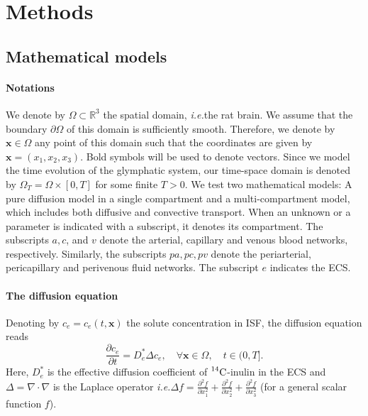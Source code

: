 \documentclass[a4paper,11pt]{article}
\newcommand{\ie}{\emph{i.e.}\;}
\newcommand{\1}{^{(1)}}
\newcommand{\2}{^{(2)}}
\newcommand{\R}{\mathbb{R}}
\newcommand {\f}   {\frac}
\newcommand {\p}   {\partial}
\newcommand {\x}   {\mathbf{x}}
\newcommand{\Cinulin}{$\prescript{14}{}{\text{C}}$-inulin }
\begin{document}
\section{Methods}
\label{sec:method}
\subsection{Mathematical models}
\paragraph{Notations} We denote by $\Omega \subset \R^3$ the spatial domain, \ie the rat brain. We assume that the boundary $\p \Omega$  of this domain is sufficiently smooth. Therefore, we denote by $\x \in \Omega$ any point of this domain such that the coordinates are given by $\x =(x_1,x_2,x_3)$. Bold symbols will be used to denote vectors. Since we model the time evolution of the glymphatic system, our time-space domain is denoted by $\Omega_T = \Omega \times [0,T]$ for some finite $T> 0$. We test two mathematical models: A pure diffusion model in a single compartment and a multi-compartment model, which includes both diffusive and convective transport. When an unknown or a parameter is indicated with a subscript, it denotes its compartment. The subscripts $a,c$, and $v$ denote the arterial, capillary and venous blood networks, respectively. Similarly, the subscripts $pa, pc, pv$ denote the periarterial, pericapillary and perivenous fluid networks. The subscript $e$ indicates the ECS.

\paragraph{The diffusion equation}
Denoting by $c_e = c_e(t,\x)$ the solute concentration in ISF, the diffusion equation reads
\begin{equation}
    \f{\p c_e}{\p t} = D_e^* \Delta c_e , \quad \forall \x\in \Omega,\quad t\in (0,T].
    \label{eq:diffusion-convection}
\end{equation}
Here, $D_e^*$ is the effective diffusion coefficient of \Cinulin in the ECS and $\Delta = \nabla \cdot \nabla$ is the Laplace operator \ie $\Delta f = \frac{\partial^2 f}{\partial x_1^2} + \frac{\partial^2 f}{\partial x_2^2} + \frac{\partial^2 f}{\partial x_3^2}  $ (for a general scalar function $f$).
\end{document}
